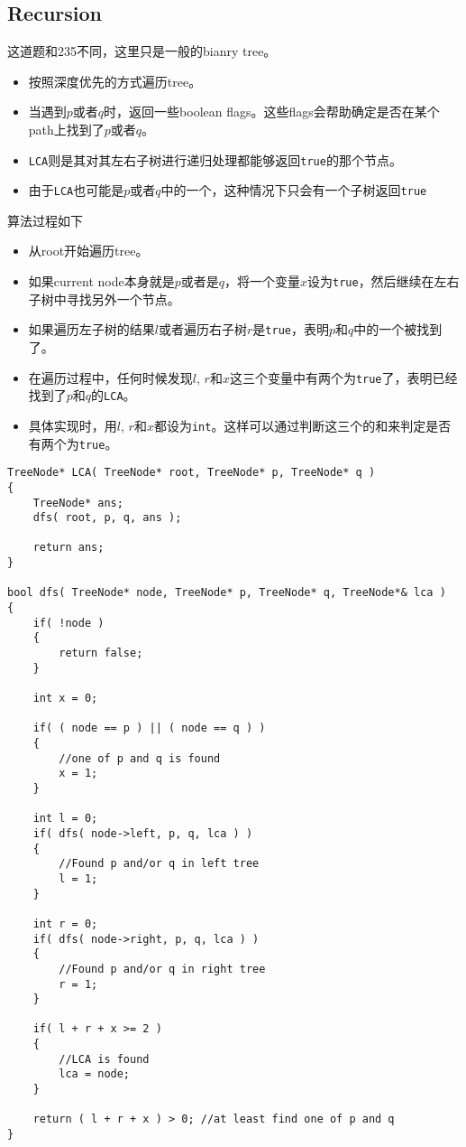 \subsection{Recursion}
这道题和235不同，这里只是一般的bianry tree。
\begin{itemize}
\item 按照深度优先的方式遍历tree。
\item 当遇到$p$或者$q$时，返回一些boolean flags。这些flags会帮助确定是否在某个path上找到了$p$或者$q$。
\item \texttt{LCA}则是其对其左右子树进行递归处理都能够返回\texttt{true}的那个节点。
\item 由于\texttt{LCA}也可能是$p$或者$q$中的一个，这种情况下只会有一个子树返回\texttt{true}
\end{itemize}
算法过程如下
\begin{itemize}
\item 从root开始遍历tree。
\item 如果current node本身就是$p$或者是$q$，将一个变量$x$设为\texttt{true}，然后继续在左右子树中寻找另外一个节点。
\item 如果遍历左子树的结果$l$或者遍历右子树$r$是\texttt{true}，表明$p$和$q$中的一个被找到了。
\item 在遍历过程中，任何时候发现$l$, $r$和$x$这三个变量中有两个为\texttt{true}了，表明已经找到了$p$和$q$的\texttt{LCA}。
\item 具体实现时，用$l$, $r$和$x$都设为\texttt{int}。这样可以通过判断这三个的和来判定是否有两个为\texttt{true}。
\end{itemize}
\setcounter{lstlisting}{0}
\begin{lstlisting}[style=customc, caption={Recursion}]
TreeNode* LCA( TreeNode* root, TreeNode* p, TreeNode* q )
{
    TreeNode* ans;
    dfs( root, p, q, ans );

    return ans;
}

bool dfs( TreeNode* node, TreeNode* p, TreeNode* q, TreeNode*& lca )
{
    if( !node )
    {
        return false;
    }

    int x = 0;

    if( ( node == p ) || ( node == q ) )
    {
        //one of p and q is found
        x = 1;
    }

    int l = 0;
    if( dfs( node->left, p, q, lca ) )
    {
        //Found p and/or q in left tree
        l = 1;
    }

    int r = 0;
    if( dfs( node->right, p, q, lca ) )
    {
        //Found p and/or q in right tree
        r = 1;
    }

    if( l + r + x >= 2 )
    {
        //LCA is found
        lca = node;
    }

    return ( l + r + x ) > 0; //at least find one of p and q
}
\end{lstlisting}
